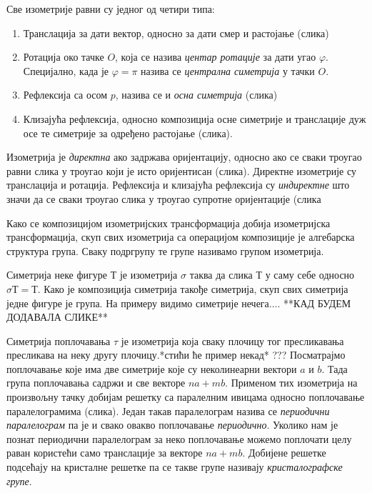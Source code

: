 \documentclass[12pt]{report}
\begin{document}
Све изометрије равни су једног од четири типа:
\begin{enumerate}
    \item Транслација за дати вектор, односно за дати смер и растојање (слика)
    \item Ротација око тачке $O$, која се назива \emph{центар ротације} за дати угао $\varphi$. Специјално, када је $\varphi = \pi$ назива се \emph{централна симетрија} у тачки $O$.
    \item Рефлексија са осом $p$, назива се и \emph{осна симетрија} (слика)
    \item Клизајућа рефлексија, односно композиција осне симетрије и транслације дуж осе те симетрије за одређено растојање (слика).
\end{enumerate} 

Изометрија је \emph{директна} ако задржава оријентацију, односно ако се сваки троугао равни слика у троугао који је исто оријентисан (слика). Директне изометрије су транслација и ротација. Рефлексија и клизајућа рефлексија су \emph{индиректне} што значи да се сваки троугао слика у троугао супротне оријентације (слика


Како се композицијом изометријских трансформација добија изометријска трансформација, скуп свих изометрија са операцијом композиције је алгебарска структура група. Сваку подргрупу те групе називамо групом изометрија. 

Симетрија неке фигуре $Т$ је изометрија $\sigma$ таква да слика $Т$ у саму себе односно $\sigma Т = Т$. Како је композиција симетрија такође симетрија, скуп свих симетрија једне фигуре је група. На примеру видимо симетрије нечега.... **КАД БУДЕМ ДОДАВАЛА СЛИКЕ**

Симетрија поплочавања $\tau$ је изометрија која сваку плочицу тог пресликавања пресликава на неку другу плочицу.*стићи ће пример некад*
 ???
Посматрајмо поплочавање које има две симетрије које су неколинеарни вектори $a$ и $b$. Тада група поплочавања садржи и све векторе $na + mb$. Применом тих изометрија на произвољну тачку добијам решетку са паралелним ивицама односно поплочавање паралелограмима (слика).  Један такав паралелограм назива се \emph{периодични паралелограм} па је и свако овакво поплочавање \emph{периодично}. Уколико нам је познат периодични паралелограм за неко поплочавање можемо поплочати целу раван користећи само транслације за векторе $na + mb$. Добијене решетке подсећају на кристалне решетке па се такве групе називају \emph{кристалографске групе}.
\end{document}

